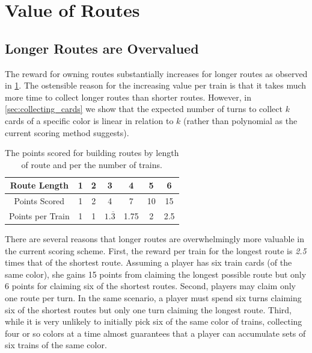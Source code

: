\newpage
\section{Value of Routes}
\subsection{Longer Routes are Overvalued}\label{sec:overvalued}
The reward for owning routes substantially 
increases for longer routes as observed in 
\cref{table:current_value}.
The ostensible reason for the increasing value per train is that
it takes much more time to collect longer routes than shorter routes.
However, in \cref{sec:collecting_cards} we show that the expected 
number of turns to collect $k$ cards of a specific
color is linear in relation to $k$
(rather than polynomial as the current scoring method suggests).

\begin{table}[H]
    \renewcommand{\arraystretch}{1.5}
    \centering
    \begin{tabular}{| c | c | c | c | c | c | c |}
    \hline
     Route Length & 1 & 2 & 3 & 4 & 5 & 6\\
     \hline
     Points Scored & 1 & 2 & 4 & 7 & 10 & 15\\
     \hline
     Points per Train & 1 & 1 & $1.\overline{3}$ & 1.75 & 2 & 2.5\\
     \hline
    \end{tabular}
    \vspace{.5cm}
    \caption{The points scored for building routes by length of route
    and per the number of trains.}
    \vspace{-.75cm}
    \label{table:current_value}
\end{table}

There are several reasons that longer routes are
overwhelmingly more valuable in the current scoring scheme.
First, the reward per train for the longest route is \textit{2.5}
times that of the shortest route.
Assuming a player has six train cards (of the same color),
she gains 15 points from claiming the longest possible route but only
6 points for claiming six of the shortest routes.
Second, players may claim only one route per turn.
In the same scenario, a player must spend six turns
claiming six of the shortest routes but only one turn
claiming the longest route.
Third, while it is very unlikely to initially pick six of the same
color of trains, collecting four or so colors at a time almost
guarantees that a player can accumulate sets of six trains
of the same color.

